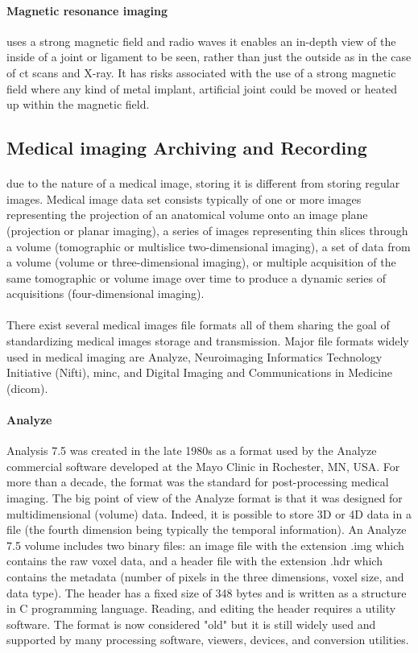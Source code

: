 \paragraph{Magnetic resonance imaging}
uses a strong magnetic field and radio waves it enables an in-depth view of the inside of a joint or ligament to be seen, rather than just the outside as in the case of \acs{ct} scans and X-ray. It has risks associated with the use of a strong magnetic field where any kind of metal implant, artificial joint could be moved or heated up within the magnetic field.
\subsection{Medical imaging Archiving and Recording} 
\paragraph{}
due to the nature of a medical image, storing it is different from storing regular images. Medical image data set consists typically of one or more images representing the projection of an anatomical volume onto an image plane (projection or planar imaging), a series of images representing thin slices through a volume (tomographic or multislice two-dimensional imaging), a set of data from a volume (volume or three-dimensional imaging), or multiple acquisition of the same tomographic or volume image over time to produce a dynamic series of acquisitions (four-dimensional imaging).\cite{ME:1}
\paragraph{}
There exist several medical images file formats all of them sharing the goal of standardizing medical images storage and transmission. Major file formats widely used in medical imaging are Analyze, Neuroimaging Informatics Technology Initiative (Nifti), \acs{minc}, and Digital Imaging and Communications in Medicine (\acs{dicom}).
\paragraph{Analyze}
Analysis 7.5 was created in the late 1980s as a format used by the Analyze commercial software developed at the Mayo Clinic in Rochester, MN, USA. For more than a decade, the format was the standard for post-processing medical imaging. The big point of view of the Analyze format is that it was designed for multidimensional (volume) data. Indeed, it is possible to store 3D or 4D data in a file (the fourth dimension being typically the temporal information). An Analyze 7.5 volume includes two binary files: an image file with the extension .img which contains the raw voxel data, and a header file with the extension .hdr which contains the metadata (number of pixels in the three dimensions, voxel size, and data type). The header has a fixed size of 348 bytes  and is written as a structure in C programming language. Reading, and editing the header requires a utility software. The format is now considered "old" but it is still widely used and supported by many processing software, viewers, devices, and conversion utilities.\cite{ME:1}
